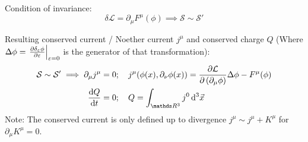 		\noindent
		Condition of invariance:
		\begin{equation}
			\delta\mathcal{L} = \partial_\mu F^\mu(\phi)
			\implies \mathcal{S} \sim \mathcal{S}'
		\end{equation}

		\noindent
		Resulting conserved current / Noether current $j^{\mu}$ and conserved charge $Q$ (Where $\Delta \phi = \eval{\pdv{\delta_\varepsilon \phi}{\varepsilon}}_{\varepsilon=0}$ is the generator of that transformation):
		\begin{equation}
			\begin{aligned}
				\mathcal{S} \sim \mathcal{S}' \implies
				\partial_\mu j^\mu &= 0;\quad
				j^\mu \qty( \phi(x), \partial_\nu\phi(x) ) = \pdv{\mathcal{L}}{\left(\partial_\mu \phi\right)}\Delta\phi - F^\mu(\phi) \\
				\dv{Q}{t} &= 0; \quad Q = \int_{\reals ^3} j^0\dd[3]{\vec{x}} \\
			\end{aligned}
		\end{equation}
		Note: The conserved current is only defined up to divergence $j^\mu \sim j^\mu + K^\mu$ for $\partial_\mu K^\mu = 0$.